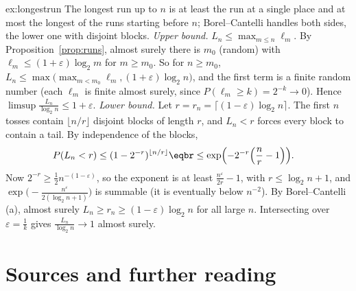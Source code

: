 \begin{solution}{ex:longestrun}
\idea The longest run up to $n$ is at least the run at a single place and at most the longest of the runs starting
before $n$; Borel--Cantelli handles both sides, the lower one with disjoint blocks.
\writeup \emph{Upper bound.} $L_n\le\max_{m\le n}\ell_m$. By Proposition~\ref{prop:runs}, almost surely there is $m_0$ (random) with $\ell_m\le(1+\varepsilon)\log_2m$
for $m\ge m_0$. So for $n\ge m_0$, $L_n\le\max\bigl(\max_{m<m_0}\ell_m,(1+\varepsilon)\log_2n\bigr)$, and the first term is a finite random number (each $\ell_m$ is
finite almost surely, since $P(\ell_m\ge k)=2^{-k}\to0$). Hence $\limsup\frac{L_n}{\log_2n}\le1+\varepsilon$.
\emph{Lower bound.} Let $r=r_n=\lceil(1-\varepsilon)\log_2n\rceil$. The first $n$ tosses contain $\lfloor n/r\rfloor$ disjoint blocks of length $r$, and $L_n<r$ forces every
block to contain a tail. By independence of the blocks,
\[
\begin{aligned}P(L_n<r)&\le(1-2^{-r})^{\lfloor n/r\rfloor}\eqbr\le\exp\Bigl(-2^{-r}\Bigl(\frac nr-1\Bigr)\Bigr).\end{aligned}
\]
Now $2^{-r}\ge\frac12n^{-(1-\varepsilon)}$, so the exponent is at least $\frac{n^\varepsilon}{2r}-1$, with $r\le\log_2n+1$, and $\exp\bigl(-\frac{n^\varepsilon}{2(\log_2n+1)}\bigr)$ is summable (it is
eventually below $n^{-2}$). By Borel--Cantelli (a), almost surely $L_n\ge r_n\ge(1-\varepsilon)\log_2n$ for all large $n$. Intersecting over
$\varepsilon=\frac1k$ gives $\frac{L_n}{\log_2n}\to1$ almost surely.
\end{solution}

\section*{Sources and further reading}

